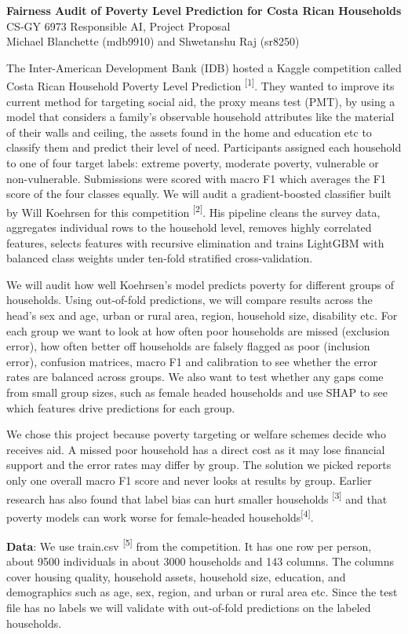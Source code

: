 \documentclass[11pt]{article}
\begin{document}
\begin{center}
{\Large\bfseries Fairness Audit of Poverty Level Prediction for Costa Rican Households}\\[6pt]
CS-GY 6973 Responsible AI, Project Proposal\\[4pt]
Michael Blanchette (mdb9910) and Shwetanshu Raj (sr8250)
\end{center}

The Inter-American Development Bank (IDB) hosted a Kaggle competition called Costa Rican Household Poverty Level Prediction \textsuperscript{[1]}. They wanted to improve its current method for targeting social aid, the proxy means test (PMT), by using a model that considers a family’s observable household attributes like the material of their walls and ceiling, the assets found in the home and education etc to classify them and predict their level of need. Participants assigned each household to one of four target labels: extreme poverty, moderate poverty, vulnerable or non-vulnerable. Submissions were scored with macro F1 which averages the F1 score of the four classes equally. We will audit a gradient-boosted classifier built by Will Koehrsen for this competition \textsuperscript{[2]}. His pipeline cleans the survey data, aggregates individual rows to the household level, removes highly correlated features, selects features with recursive elimination and trains LightGBM with balanced class weights under ten-fold stratified cross-validation.
\par
We will audit how well Koehrsen’s model predicts poverty for different groups of households. Using out-of-fold predictions, we will compare results across the head’s sex and age, urban or rural area, region, household size, disability etc. For each group we want to look at how often poor households are missed (exclusion error), how often better off households are falsely flagged as poor (inclusion error), confusion matrices, macro F1 and calibration to see whether the error rates are balanced across groups. We also want to test whether any gaps come from small group sizes, such as female headed households and use SHAP to see which features drive predictions for each group.
\par
We chose this project because poverty targeting or welfare schemes decide who receives aid. A missed poor household has a direct cost as it may lose financial support and the error rates may differ by group. The solution we picked reports only one overall macro F1 score and never looks at results by group. Earlier research has also found that label bias can hurt smaller households \textsuperscript{[3]} and that poverty models can work worse for female-headed households\textsuperscript{[4]}.
\par
\textbf{Data}: We use train.csv \textsuperscript{[5]} from the competition. It has one row per person, about 9500 individuals in about 3000 households and 143 columns. The columns cover housing quality, household assets, household size, education, and demographics such as age, sex, region, and urban or rural area etc. Since the test file has no labels we will validate with out-of-fold predictions on the labeled households. 
\end{document}
